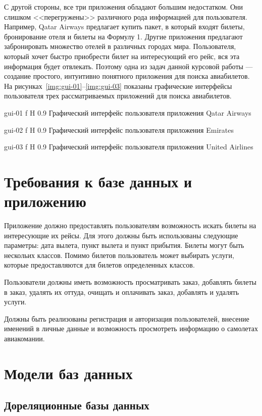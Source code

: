 \documentclass{bmstu}
\begin{document}
С другой стороны, все три приложения обладают большим недостатком. 
Они слишком <<перегружены>> различного рода информацией для пользователя. 
Например, Qatar Airways предлагает купить пакет, в который входят билеты, бронирование отеля и билеты на Формулу 1. 
Другие приложения предлагают забронировать множество отелей в различных городах мира. 
Пользователя, который хочет быстро приобрести билет на интересующий его рейс, вся эта информация будет отвлекать. 
Поэтому одна из задач данной курсовой работы --- создание простого, интуитивно понятного приложения для поиска авиабилетов. 
На рисунках~\ref{img:gui-01}--\ref{img:gui-03} показаны графические интерфейсы пользователя трех рассматриваемых приложений для поиска авиабилетов.

    {gui-01}
    {f}
    {H}
    {0.9\textwidth}
    {Графический интерфейс пользователя приложения Qatar Airways}
    
    {gui-02}
    {f}
    {H}
    {0.9\textwidth}
    {Графический интерфейс пользователя приложения Emirates}
    
    {gui-03}
    {f}
    {H}
    {0.9\textwidth}
    {Графический интерфейс пользователя приложения United Airlines}

\section{Требования к базе данных и приложению}

Приложение должно предоставлять пользователям возможность искать билеты на интересующие их рейсы. 
Для этого должны быть использованы следующие параметры: дата вылета, пункт вылета и пункт прибытия. 
Билеты могут быть нескольих классов. 
Помимо билетов пользователь может выбирать услуги, которые предоставляются для билетов определенных классов.

Пользователи должны иметь возможность просматривать заказ, добавлять билеты в заказ, удалять их оттуда, очищать и оплачивать заказ, добавлять и удалять услуги.
 
Должны быть реализованы регистрация и авторизация пользователей, внесение именений в личные данные и возможность просмотреть информацию о самолетах авиакомании.

\section{Модели баз данных}

\subsection{Дореляционные базы данных}
\end{document}
